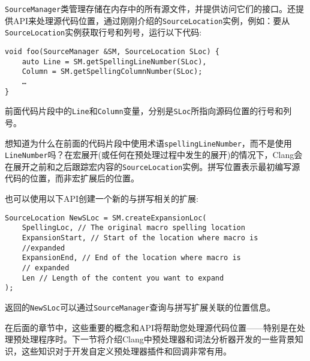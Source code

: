 
\texttt{SourceManager}类管理存储在内存中的所有源文件，并提供访问它们的接口。还提供API来处理源代码位置，通过刚刚介绍的\texttt{SourceLocation}实例，例如：要从\texttt{SourceLocation}实例获取行号和列号，运行以下代码:

\begin{lstlisting}[style=styleCXX]
void foo(SourceManager &SM, SourceLocation SLoc) {
	auto Line = SM.getSpellingLineNumber(SLoc),
	Column = SM.getSpellingColumnNumber(SLoc);
	…
}
\end{lstlisting}

前面代码片段中的\texttt{Line}和\texttt{Column}变量，分别是\texttt{SLoc}所指向源码位置的行号和列号。

想知道为什么在前面的代码片段中使用术语\texttt{spellingLineNumber}，而不是使用\texttt{LineNumber}吗？在宏展开(或任何在预处理过程中发生的展开)的情况下，Clang会在展开之前和之后跟踪宏内容的\texttt{SourceLocation}实例。拼写位置表示最初编写源代码的位置，而非宏扩展后的位置。

也可以使用以下API创建一个新的与拼写相关的扩展:

\begin{lstlisting}[style=styleCXX]
SourceLocation NewSLoc = SM.createExpansionLoc(
	SpellingLoc, // The original macro spelling location
	ExpansionStart, // Start of the location where macro is
	//expanded
	ExpansionEnd, // End of the location where macro is
	// expanded
	Len // Length of the content you want to expand
);
\end{lstlisting}

返回的\texttt{NewSLoc}可以通过\texttt{SourceManager}查询与拼写扩展关联的位置信息。

在后面的章节中，这些重要的概念和API将帮助您处理源代码位置——特别是在处理预处理程序时。下一节将介绍Clang中预处理器和词法分析器开发的一些背景知识，这些知识对于开发自定义预处理器插件和回调非常有用。













